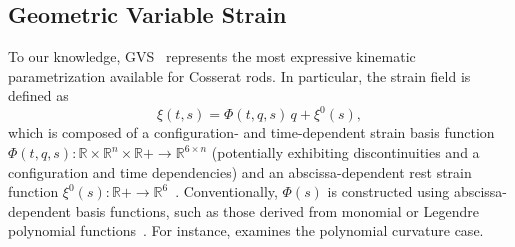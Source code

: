 \subsection{Geometric Variable Strain}
To our knowledge, \gls{GVS}~\citep{renda2020geometric, boyer2020dynamics, mathew2025reduced} represents the most expressive kinematic parametrization available for Cosserat rods. In particular, the strain field is defined as
\begin{equation}
    \xi(t,s) = \Phi(t,q,s) \, q + \xi^0(s),
\end{equation}
which is composed of a configuration- and time-dependent strain basis function $\Phi(t,q,s): \mathbb{R} \times \mathbb{R}^n \times \mathbb{R}+ \to \mathbb{R}^{6 \times n}$ (potentially exhibiting discontinuities and a configuration and time dependencies) and an abscissa-dependent rest strain function $\xi^0(s): \mathbb{R}+ \to \mathbb{R}^6$~\citep{mathew2025reduced}. Conventionally, $\Phi(s)$ is constructed using abscissa-dependent basis functions, such as those derived from monomial or Legendre polynomial functions~\citep{mathew2025reduced}. For instance, \citet{della2019control} examines the polynomial curvature case.

